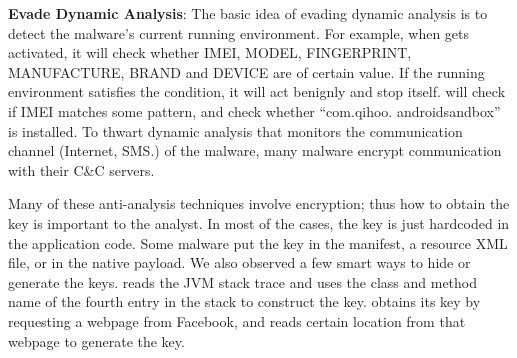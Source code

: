 {\bf Evade Dynamic Analysis}: The basic idea of evading dynamic analysis is to detect the malware's
current running environment.
For example,
when  \cite{bankBot} gets activated, it will check whether
IMEI, MODEL, FINGERPRINT, MANUFACTURE, BRAND and DEVICE are of certain
value.
If the running environment satisfies the condition,
it will act benignly and stop itself.
 will check if IMEI matches some pattern, and
check whether ``com.qihoo. androidsandbox'' is installed.
To thwart dynamic analysis that monitors the communication
channel (\eg Internet, SMS.) of the malware,
many malware encrypt communication with their C\&C servers.

Many of these anti-analysis techniques involve encryption;
thus how to obtain the key is important to the analyst.
In most of the cases, the key is just hardcoded in the application code.
Some malware put the key in the
manifest, a resource XML file, or in the native payload.
We also observed a few smart ways to hide or generate the keys.
 reads the JVM stack trace and uses the class and method name
of the fourth entry in the stack to construct the key. 
 obtains its key by requesting a webpage from Facebook, and reads
certain location from that webpage to generate the key.

